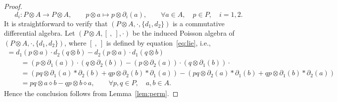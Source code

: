 \documentclass[10pt,a4paper]{amsart}
\numberwithin{equation}{section}
\begin{document}
\begin{proof}
 \begin{equation*}
 	d_i: P \otimes A \to P \otimes A, \qquad p \otimes a \mapsto p \otimes \partial_i(a), \qquad \forall a \in A, \quad p \in P, \quad i=1,2.
 \end{equation*}
 It is straightforward to verify that $(P \otimes A, \cdot, \{d_1, d_2\})$ is a commutative differential algebra.
 Let $(P \otimes A, [\ ,\ ], \cdot)$ be the induced Poisson algebra of
 $(P \otimes A, \cdot, \{d_1, d_2\})$, where $[\ ,\ ]$ is defined by equation~\eqref{eq:lie}, i.e.,
 \begin{gather*}
 	[p \otimes a, q \otimes b] = d_1(p \otimes a) \cdot d_2(q \otimes b) - d_2(p \otimes a) \cdot d_1(q \otimes b) \\
 \qquad{}= (p \otimes \partial_1(a)) \cdot (q \otimes \partial_2(b)) - (p \otimes \partial_2(a) ) \cdot (q \otimes \partial_1(b)) \cdot\\
 \qquad{}= (pq \otimes \partial_1(a) \ast \partial_2(b) + qp \otimes \partial_2(b) \ast \partial_1(a)) - ( pq \otimes \partial_2(a) \ast \partial_1(b) + qp \otimes \partial_1(b) \ast \partial_2(a))\\
\qquad{} = pq \otimes a \diamond b-qp \otimes b \diamond a, \qquad \forall p,q \in P, \quad a, b \in A.
	\end{gather*}
	Hence the conclusion follows from Lemma~\ref{lem:perm}.
\end{proof}
\end{document}
